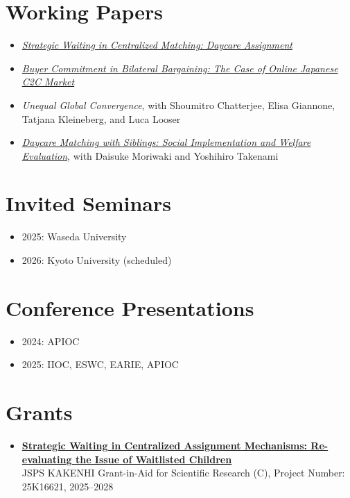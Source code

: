 \documentclass[11pt]{article}
\begin{document}
\section*{Working Papers}
\begin{itemize}
\item \href{https://arxiv.org/abs/2311.07920}{\textit{Strategic Waiting in Centralized Matching: Daycare Assignment}}
\item \href{https://arxiv.org/abs/2602.13707}{\textit{Buyer Commitment in Bilateral Bargaining: The Case of Online Japanese C2C Market}}
\item \textit{Unequal Global Convergence}, with Shoumitro Chatterjee, Elisa Giannone, Tatjana Kleineberg, and Luca Looser
\item \href{https://arxiv.org/abs/2604.13597}{\textit{Daycare Matching with Siblings: Social Implementation and Welfare Evaluation}}, with Daisuke Moriwaki and Yoshihiro Takenami
\end{itemize}

\section*{Invited Seminars}
\begin{itemize}
\item 2025: Waseda University
\item 2026: Kyoto University (scheduled)
\end{itemize}

\section*{Conference Presentations}
\begin{itemize}
\item 2024: APIOC
\item 2025: IIOC, ESWC, EARIE, APIOC
\end{itemize}

\section*{Grants}
\begin{itemize}
\item \href{https://kaken.nii.ac.jp/grant/KAKENHI-PROJECT-25K16621/}{\textbf{Strategic Waiting in Centralized Assignment Mechanisms: Re-evaluating the Issue of Waitlisted Children}}\\
JSPS KAKENHI Grant-in-Aid for Scientific Research (C), Project Number: 25K16621, 2025--2028
\end{itemize}
\end{document}
